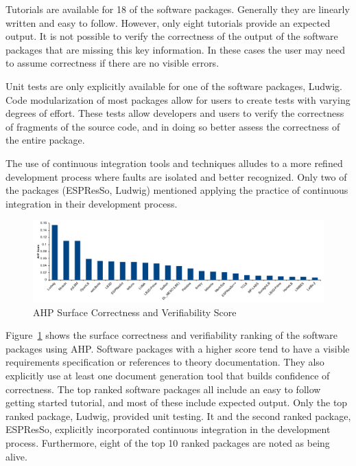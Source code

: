 \documentclass[final, 3p, times, authoryear]{elsarticle}
\begin{document}
Tutorials are available for 18 of the software packages. Generally they are
linearly written and easy to follow. However, only eight tutorials provide an
expected output. It is not possible to verify the correctness of the output of
the software packages that are missing this key information. In these cases the
user may need to assume correctness if there are no visible errors.

Unit tests are only explicitly available for one of the software packages,
Ludwig. Code modularization of most packages allow for users to create tests
with varying degrees of effort. These tests allow developers and users to verify
the correctness of fragments of the source code, and in doing so better assess
the correctness of the entire package.

The use of continuous integration tools and techniques alludes to a more refined
development process where faults are isolated and better recognized. Only two of
the packages (ESPResSo, Ludwig) mentioned applying the practice of continuous
integration in their development process. 

\begin{figure}[h!]
	\begin{center}
		\includegraphics[width=1.0\textwidth]{./figures/correctnessverifiability.pdf}
		\caption{AHP Surface Correctness and Verifiability Score}
		\label{Fig_CorrectnessVerifiability}
	\end{center}
\end{figure}

Figure~\ref{Fig_CorrectnessVerifiability} shows the surface correctness and
verifiability ranking of the software packages using AHP. Software packages with
a higher score tend to have a visible requirements specification or references
to theory documentation. They also explicitly use at least one document
generation tool that builds confidence of correctness. The top ranked software
packages all include an easy to follow getting started tutorial, and most of
these include expected output. Only the top ranked package, Ludwig, provided
unit testing. It and the second ranked package, ESPResSo, explicitly
incorporated continuous integration in the development process. Furthermore,
eight of the top 10 ranked packages are noted as being alive.
\end{document}
